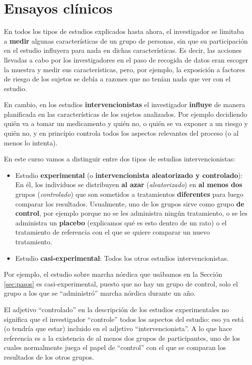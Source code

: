 \documentclass[
]{book}
\theoremstyle{definition}
\theoremstyle{definition}
\theoremstyle{definition}
\theoremstyle{definition}
\theoremstyle{remark}
\begin{document}
\hypertarget{ensayos-cluxednicos}{%
\section{Ensayos clínicos}\label{ensayos-cluxednicos}}

En todos los tipos de estudios explicados hasta ahora, el investigador se limitaba a \textbf{medir} algunas características de un grupo de personas, sin que su participación en el estudio influyera para nada en dichas características. Es decir, las acciones llevadas a cabo por los investigadores en el paso de recogida de datos eran escoger la muestra y medir sus características, pero, por ejemplo, la exposición a factores de riesgo de los sujetos se debía a razones que no tenían nada que ver con el estudio.

En cambio, en los estudios \textbf{intervencionistas} el investigador \textbf{influye} de manera planificada en las características de los sujetos analizados. Por ejemplo decidiendo quién va a tomar un medicamento y quién no, o quién se va exponer a un riesgo y quién no, y en principio controla todos los aspectos relevantes del proceso (o al menos lo intenta).

En este curso vamos a distinguir entre dos tipos de estudios intervencionistas:

\begin{itemize}
\item
  Estudio \textbf{experimental} (o \textbf{intervencionista aleatorizado y controlado}): En él, los individuos se distribuyen \textbf{al azar} (\emph{aleatorizado}) en \textbf{al menos dos} grupos (\emph{controlado}) que son sometidos a tratamientos \textbf{diferentes} para luego comparar los resultados. Usualmente, uno de los grupos sirve como grupo \textbf{de control}, por ejemplo porque no se les administra ningún tratamiento, o se les administra un \textbf{placebo} (explicamos qué es esto dentro de un rato) o el tratamiento de referencia con el que se quiere comparar un nuevo tratamiento.
\item
  Estudio \textbf{casi-experimental}: Todos los otros estudios intervencionistas.
\end{itemize}

Por ejemplo, el estudio sobre marcha nórdica que usábamos en la Sección \ref{sec:pasos} es casi-experimental, puesto que no hay un grupo de control, solo el grupo a los que se ``administró'' marcha nórdica durante un año.

\begin{rmdcaution}
El adjetivo ``controlado'' en la descripción de los estudios experimentales no significa que el investigador ``controle'' todos los aspectos del estudio: eso ya está (o tendría que estar) incluido en el adjetivo ``intervencionista''. A lo que hace referencia es a la existencia de al menos dos grupos de participantes, uno de los cuales normalmente juega el papel de ``control'' con el que se comparan los resultados de los otros grupos.
\end{rmdcaution}
\end{document}
